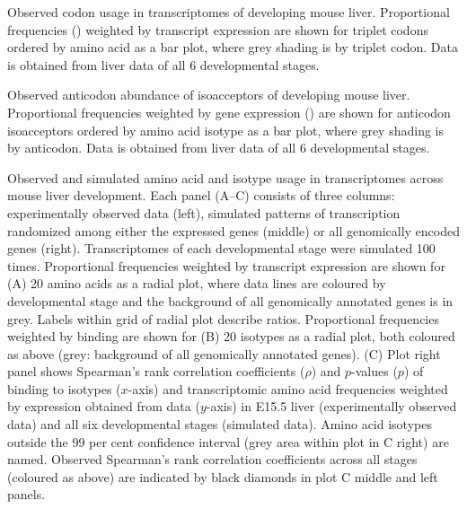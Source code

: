     {Observed codon usage in \mrna transcriptomes of developing mouse liver.}
    {Proportional frequencies (\rcu) weighted by transcript expression are shown
    for triplet codons ordered by amino acid as a bar plot, where grey shading
    is by triplet codon. Data is obtained from liver \rnaseq data of all \num{6}
    developmental stages.}

    {Observed anticodon abundance of \trna isoacceptors of developing mouse
    liver.}
    {Proportional frequencies weighted by \trna gene expression (\raa) are shown
    for anticodon isoacceptors ordered by amino acid isotype as a bar plot,
    where grey shading is by anticodon. Data is obtained from liver 
    \chipseq data of all \num{6} developmental stages.}

\thispagestyle{empty}
    {Observed and simulated amino acid and isotype usage in transcriptomes
    across mouse liver development.}
    {Each panel (A–C) consists of three columns: experimentally observed data
    (left), simulated patterns of transcription randomized among either the
    expressed genes (middle) or all genomically encoded genes (right).
    Transcriptomes of each developmental stage were simulated \num{100} times.
    Proportional frequencies weighted by transcript expression are shown for (A)
    \num{20} amino acids as a radial plot, where data lines are coloured by
    developmental stage and the background of all genomically annotated \mrna
    genes is in grey. Labels within grid of radial plot describe ratios.
    Proportional frequencies weighted by  binding are shown for (B)
    \num{20} isotypes as a radial plot, both coloured as above (grey: background
    of all genomically annotated \trna genes). (C) Plot right panel shows
    Spearman’s rank correlation coefficients (\(\rho\)) and \(p\)-values (\(p\))
    of  binding to \trna isotypes (\(x\)-axis) and transcriptomic amino
    acid frequencies weighted by expression obtained from \rnaseq data
    (\(y\)-axis) in E15.5 liver (experimentally observed data) and all six
    developmental stages (simulated data). Amino acid isotypes outside the
    \num{99} per cent confidence interval (grey area within plot in C right) are
    named. Observed Spearman’s rank correlation coefficients across all stages
    (coloured as above) are indicated by black diamonds in plot C middle and
    left panels.}

